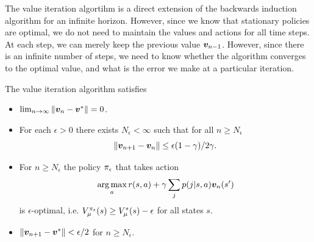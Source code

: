   The value iteration algortihm is a direct extension of the backwards induction algorithm for an infinite horizon. However, since we know that stationary policies are optimal, we do not need to maintain the values and actions for all time steps. At each step, we can merely keep the previous value $\val_{n-1}$. However, since there is an infinite number of steps, we need to know whether the algorithm converges to the optimal value, and what is the error we make at a particular iteration.
  \begin{theorem}
    The value iteration algorithm satisfies
    \begin{itemize}
    \item $\lim_{n \to \infty} \|\val_n - \val^*\| = 0$. 
    \item For each $\epsilon>0$ there exists $N_\epsilon <\infty$ such that for all $n\geq N_\epsilon$
      \begin{equation}
        \|\val_{n+1} - \val_n\| \leq \epsilon(1 - \disc)/2\disc.
        \label{eq:value-iteration-stopping}
      \end{equation}
    \item For $n\geq N_\epsilon$ the policy $\pi_\epsilon$ that takes action
      \[
      \argmax_a r(s,a) + \disc \sum_j p(j|s,a)\val_n(s')
      \]
      is
      $\epsilon$-optimal, i.e. $V^{\pi_\epsilon}_\mu(s) \geq V^*_\mu(s) - \epsilon$ for all states $s$.
    \item $\|\val_{n+1} - \val^*\| < \epsilon/2$ for $n \geq N_\epsilon$.
    \end{itemize}
  \end{theorem}

